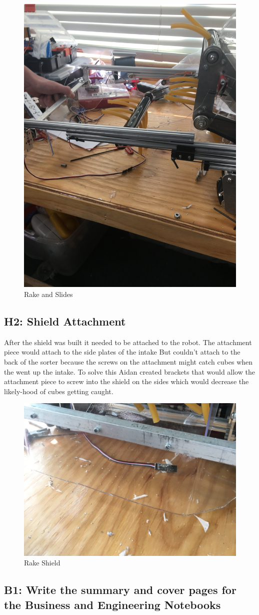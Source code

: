\documentclass{article}
\begin{document}
\begin{figure}
    \centering
    \includegraphics[width=.6 \textwidth, angle=-90 ]{11_11-12/images/rake_slides.JPG}
    \caption{Rake and Slides}
    \label{fig:Intake CAD}
\end{figure}

\subsection{H2: Shield Attachment}

After the shield was built it needed to be attached to the robot. The attachment piece would attach to the side plates of the intake But couldn't attach to the back of the sorter because the screws on the attachment might catch cubes when the went up the intake. To solve this Aidan created brackets that would allow the attachment piece to screw into the shield on the sides which would decrease the likely-hood of cubes getting caught.

\begin{figure}
    \centering
    \includegraphics[width=.6 \textwidth]{11_11-12/images/rake.jpg}
    \caption{Rake Shield}
    \label{fig:rakeshield}
\end{figure}\subsection{B1: Write the summary and cover pages for the Business and Engineering Notebooks}
\end{document}
